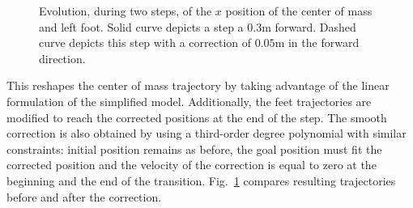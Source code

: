 \begin{figure}[ht!]
  \begin{center}
  \end{center}
  \caption{Evolution, during two steps, of the $x$ position of the
    center of mass and left foot. Solid curve depicts a step a $0.3
    \mathrm{m}$ forward. Dashed curve depicts this step with a
    correction of $0.05 \mathrm{m}$ in the forward
    direction. \label{fig:traj}}
\end{figure}


This reshapes the center of mass trajectory by taking advantage of the
linear formulation of the simplified model. Additionally, the feet
trajectories are modified to reach the corrected positions at the end
of the step. The smooth correction is also obtained by using a
third-order degree polynomial with similar constraints: initial
position remains as before, the goal position must fit the corrected
position and the velocity of the correction is equal to zero at the
beginning and the end of the transition. Fig.~\ref{fig:traj}
compares resulting trajectories before and after the correction.


